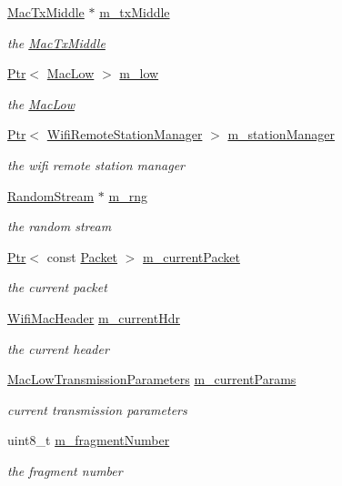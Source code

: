 \begin{DoxyCompactItemize}
\hyperlink{classns3_1_1MacTxMiddle}{Mac\+Tx\+Middle} $\ast$ \hyperlink{classns3_1_1DcaTxop_a605ac1de505d652e229d14a9e75c7b1a}{m\+\_\+tx\+Middle}
\begin{DoxyCompactList}\small\item\em the \hyperlink{classns3_1_1MacTxMiddle}{Mac\+Tx\+Middle} \end{DoxyCompactList}\item 
\hyperlink{classns3_1_1Ptr}{Ptr}$<$ \hyperlink{classns3_1_1MacLow}{Mac\+Low} $>$ \hyperlink{classns3_1_1DcaTxop_a76de11e512290acc37c9863f7ab17758}{m\+\_\+low}
\begin{DoxyCompactList}\small\item\em the \hyperlink{classns3_1_1MacLow}{Mac\+Low} \end{DoxyCompactList}\item 
\hyperlink{classns3_1_1Ptr}{Ptr}$<$ \hyperlink{classns3_1_1WifiRemoteStationManager}{Wifi\+Remote\+Station\+Manager} $>$ \hyperlink{classns3_1_1DcaTxop_af78d36622900e857d31315038946d8f6}{m\+\_\+station\+Manager}
\begin{DoxyCompactList}\small\item\em the wifi remote station manager \end{DoxyCompactList}\item 
\hyperlink{classns3_1_1RandomStream}{Random\+Stream} $\ast$ \hyperlink{classns3_1_1DcaTxop_a9044b173b448e6c40b730740621cb238}{m\+\_\+rng}
\begin{DoxyCompactList}\small\item\em the random stream \end{DoxyCompactList}\item 
\hyperlink{classns3_1_1Ptr}{Ptr}$<$ const \hyperlink{classns3_1_1Packet}{Packet} $>$ \hyperlink{classns3_1_1DcaTxop_a3c454c21337aac0944f86caad8b7a719}{m\+\_\+current\+Packet}
\begin{DoxyCompactList}\small\item\em the current packet \end{DoxyCompactList}\item 
\hyperlink{classns3_1_1WifiMacHeader}{Wifi\+Mac\+Header} \hyperlink{classns3_1_1DcaTxop_ae965eb2f4d504e00526e751cd1dab3a6}{m\+\_\+current\+Hdr}
\begin{DoxyCompactList}\small\item\em the current header \end{DoxyCompactList}\item 
\hyperlink{classns3_1_1MacLowTransmissionParameters}{Mac\+Low\+Transmission\+Parameters} \hyperlink{classns3_1_1DcaTxop_a4b7bf5601dc39d1f1828856276893ced}{m\+\_\+current\+Params}
\begin{DoxyCompactList}\small\item\em current transmission parameters \end{DoxyCompactList}\item 
uint8\+\_\+t \hyperlink{classns3_1_1DcaTxop_a2ce18e9e092b3e606bb4feb7e5dd39fc}{m\+\_\+fragment\+Number}
\begin{DoxyCompactList}\small\item\em the fragment number \end{DoxyCompactList}\end{DoxyCompactItemize}
